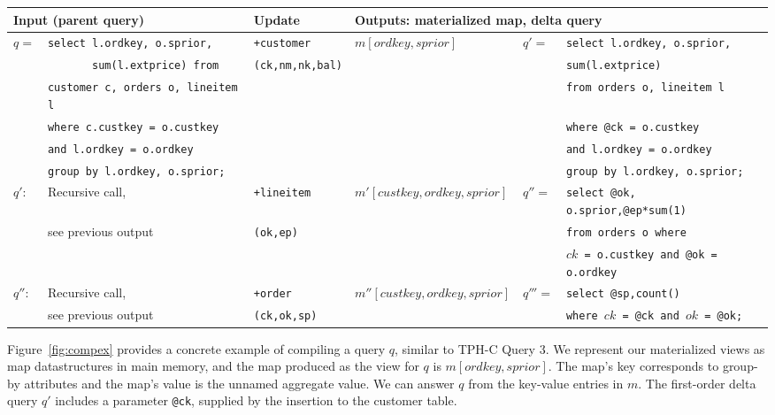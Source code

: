 \def \sql#1{{\scriptsize {\tt #1}}}
\begin{figure*}[htbp]
\begin{tabular}{ll|l|l|ll}
\multicolumn{2}{l}{Input (parent query)}
& Update 
& \multicolumn{3}{l}{Outputs: materialized map, delta query}
\\
\hline
$q =$
& \sql{select l.ordkey, o.sprior,}
& \texttt{+customer}
& $m[ordkey,sprior]$
& $q' =$
& \sql{select l.ordkey, o.sprior,}
\\
& \sql{\ \ \ \ \ \ \ sum(l.extprice) from}
& \texttt{(ck,nm,nk,bal)}
& & & \sql{sum(l.extprice)}
\\
& \sql{customer c, orders o, lineitem l}
& & & & \sql{from orders o, lineitem l}
\\
& \sql{where c.custkey = o.custkey}
& & & & \sql{where @ck = o.custkey} 
\\
& \sql{and l.ordkey = o.ordkey}
& & & & \sql{and l.ordkey = o.ordkey}
\\
& \sql{group by l.ordkey, o.sprior;}
& & & & \sql{group by l.ordkey, o.sprior;}
\\
\hline
$q'$:
& Recursive call,
& \texttt{+lineitem} 
& $m'[custkey,ordkey,sprior]$
& $q'' =$ & \sql{select @ok, o.sprior,@ep*sum(1)}
\\
& see previous output
& \texttt{(ok,ep)} & & & \sql{from orders o where}
\\
& & & & & \sql{$ck$ = o.custkey and @ok = o.ordkey}
\\
\hline
$q''$:
& Recursive call,
& \texttt{+order} 
& $m''[custkey,ordkey,sprior]$
& $q'''=$ & \sql{select @sp,count()}
\\
& see previous output
& \texttt{(ck,ok,sp)}
& & & \sql{where $ck$ = @ck and $ok$ = @ok;}
\end{tabular}
\caption{Recursive query compilation in DBToaster. For query $q$, we produce a
sequence of materializations and delta queries for maintenance: $\tuple{m,q'},
\tuple{m',q''}, \tuple{m'',q'''}$. This is a partial compilation trace, our
algorithm considers all permutations of updates.}
\label{fig:compex}
\end{figure*}


Figure~\ref{fig:compex} provides a concrete example of compiling a query $q$,
similar to TPH-C Query 3. We represent our materialized views as map
datastructures in main memory, and the map produced as the view for $q$ is
$m[ordkey,sprior]$. The map's key corresponds to group-by attributes and the
map's value is the unnamed aggregate value. We can answer $q$ from the
key-value entries in $m$. The first-order delta query $q'$ includes a parameter
{\tt @ck}, supplied by the insertion to the customer table.

